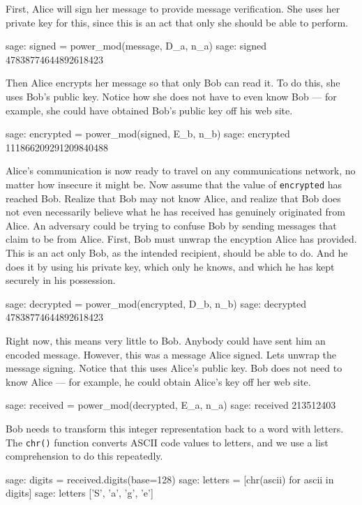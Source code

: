 %
First, Alice will sign her message to provide message verification.  She uses her private key for this, since this is an act that only she should be able to perform.
%
\begin{sageexample}
sage: signed = power_mod(message, D_a, n_a)
sage: signed
47838774644892618423
\end{sageexample}
%
Then Alice encrypts her message so that only Bob can read it.  To do this, she uses Bob's public key.  Notice how she does not have to even know Bob --- for example, she could have obtained Bob's public key off his web site.
%
\begin{sageexample}
sage: encrypted = power_mod(signed, E_b, n_b)
sage: encrypted
111866209291209840488
\end{sageexample}
%
Alice's communication is now ready to travel on any communications network, no matter how insecure it might be.
%
%
Now assume that the value of \verb?encrypted? has reached Bob.  Realize that Bob may not know Alice, and realize that Bob does not even necessarily believe what he has received has genuinely originated from Alice.  An adversary could be trying to confuse Bob by sending messages that claim to be from Alice.  First, Bob must unwrap the encyption Alice has provided.  This is an act only Bob, as the intended recipient, should be able to do.  And he does it by using his private key, which only he knows, and which he has kept securely in his possession.
%
\begin{sageexample}
sage: decrypted = power_mod(encrypted, D_b, n_b)
sage: decrypted
47838774644892618423
\end{sageexample}
%
Right now, this means very little to Bob.  Anybody could have sent him an encoded message.  However, this was a message Alice signed.  Lets unwrap the message signing.  Notice that this uses Alice's public key.  Bob does not need to know Alice --- for example, he could obtain Alice's key off her web site.
%
\begin{sageexample}
sage: received = power_mod(decrypted, E_a, n_a)
sage: received
213512403
\end{sageexample}
%
Bob needs to transform this integer representation back to a word with letters.  The \verb?chr()? function converts ASCII code values to letters, and we use a list comprehension to do this repeatedly.
%
\begin{sageexample}
sage: digits = received.digits(base=128)
sage: letters = [chr(ascii) for ascii in digits]
sage: letters
['S', 'a', 'g', 'e']
\end{sageexample}
